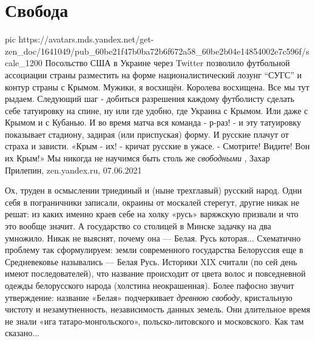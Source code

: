  
 
 
 
 
\chapter{Свобода}

\ifcmt
  pic https://avatars.mds.yandex.net/get-zen_doc/1641049/pub_60be21f47b0ba72b6f672a58_60be2b04e14854002e7c596f/scale_1200
\fi
Посольство США в Украине через Twitter позволило футбольной ассоциации страны
разместить на форме националистический лозунг \enquote{СУГС} и контур страны с Крымом.
Мужики, я восхищён. Королева восхищена. Все мы тут рыдаем. Следующий шаг -
добиться разрешения каждому футболисту сделать себе татуировку на спине, ну или
где удобно, где Украина с Крымом.  Или даже с Крымом и с Кубанью.  И во время
матча вся команда - р-раз! - и эту татуировку показывает стадиону, задирая (или
приспуская) форму. И русские плачут от страха и зависти.  «Крым - их! - кричат
русские в ужасе. - Смотрите! Видите! Вон их Крым!» Мы никогда не научимся быть
столь же \emph{свободными}
, 
Захар Прилепин, zen.yandex.ru, 07.06.2021

Ох, труден в осмыслении триединый и (ныне трехглавый) русский народ. Одни себя
в пограничники записали, окраины от москалей стерегут, другие никак не решат:
из каких именно краев себе на холку «русь» варяжскую призвали и что это вообще
значит. А государство со столицей в Минске задачку на два умножило. Никак не
выяснят, почему она — Белая. Русь которая... Схематично проблему так
сформулируем: земли современного государства Белоруссия еще в Средневековье
назывались — Белая Русь. Историки XIX считали (по сей день имеют
последователей), что название происходит от цвета волос и повседневной одежды
белорусского народа (холстина неокрашенная).  Более пафосно звучит утверждение:
название «Белая» подчеркивает \emph{древнюю свободу}, кристальную чистоту и
незамутненность, независимость данных земель. Они длительное время не знали
«ига татаро-монгольского», польско-литовского и московского. Как там сказано...
